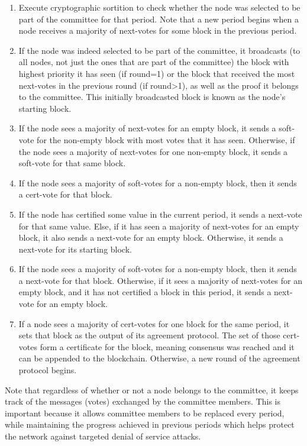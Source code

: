 \begin{enumerate}
  \item Execute cryptographic sortition to check whether the node was selected to be part of the committee for that period. Note that a new period begins when a node receives a majority of next-votes for some block in the previous period.
  \item If the node was indeed selected to be part of the committee, it broadcasts (to all nodes, not just the ones that are part of the committee) the block with highest priority it has seen (if round=1) or the block that received the most next-votes in the previous round (if round>1), as well as the proof it belongs to the committee. This initially broadcasted block is known as the node’s starting block.
  \item If the node sees a majority of next-votes for an empty block, it sends a soft-vote for the non-empty block with most votes that it has seen. Otherwise, if the node sees a majority of next-votes for one non-empty block, it sends a soft-vote for that same block.
  \item If the node sees a majority of soft-votes for a non-empty block, then it sends a cert-vote for that block.
  \item If the node has certified some value in the current period, it sends a next-vote for that same value. Else, if it has seen a majority of next-votes for an empty block, it also sends a next-vote for an empty block. Otherwise, it sends a next-vote for its starting block.
  \item If the node sees a majority of soft-votes for a non-empty block, then it sends a next-vote for that block. Otherwise, if it sees a majority of next-votes for an empty block, and it has not certified a block in this period, it sends a next-vote for an empty block.
  \item If a node sees a majority of cert-votes for one block for the same period, it sets that block as the output of its agreement protocol. The set of those cert-votes form a certificate for the block, meaning consensus was reached and it can be appended to the blockchain. Otherwise, a new round of the agreement protocol begins.
\end{enumerate}

Note that regardless of whether or not a node belongs to the committee, it keeps track of the messages (votes) exchanged by the committee members. This is important because it allows committee members to be replaced every period, while maintaining the progress achieved in previous periods which helps protect the network against targeted denial of service attacks.


